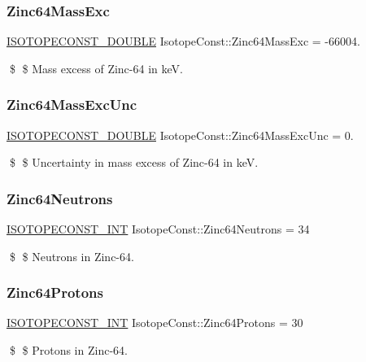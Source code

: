 \subsubsection{\texorpdfstring{Zinc64\+Mass\+Exc}{Zinc64MassExc}}
{\footnotesize\ttfamily \mbox{\hyperlink{group___isotope_const-_macros_ga8f45a7272ce02c0b4c65c44636ed719a}{I\+S\+O\+T\+O\+P\+E\+C\+O\+N\+S\+T\+\_\+\+D\+O\+U\+B\+LE}} Isotope\+Const\+::\+Zinc64\+Mass\+Exc = -\/66004.}

\$ \$ Mass excess of Zinc-\/64 in keV. \mbox{\label{group___isotope_const-_zinc-_zn64_gafa33b07dff4058980ea2e0817e00f0b4}} 
\subsubsection{\texorpdfstring{Zinc64\+Mass\+Exc\+Unc}{Zinc64MassExcUnc}}
{\footnotesize\ttfamily \mbox{\hyperlink{group___isotope_const-_macros_ga8f45a7272ce02c0b4c65c44636ed719a}{I\+S\+O\+T\+O\+P\+E\+C\+O\+N\+S\+T\+\_\+\+D\+O\+U\+B\+LE}} Isotope\+Const\+::\+Zinc64\+Mass\+Exc\+Unc = 0.}

\$ \$ Uncertainty in mass excess of Zinc-\/64 in keV. \mbox{\label{group___isotope_const-_zinc-_zn64_ga15c90230c6179d136aa562e7ba0c5eff}} 
\subsubsection{\texorpdfstring{Zinc64\+Neutrons}{Zinc64Neutrons}}
{\footnotesize\ttfamily \mbox{\hyperlink{group___isotope_const-_macros_ga5f18360b3e99483a35c32d789e62621c}{I\+S\+O\+T\+O\+P\+E\+C\+O\+N\+S\+T\+\_\+\+I\+NT}} Isotope\+Const\+::\+Zinc64\+Neutrons = 34}

\$ \$ Neutrons in Zinc-\/64. \mbox{\label{group___isotope_const-_zinc-_zn64_gaccc8c802f937d0b74a2f300c9fda92dd}} 
\subsubsection{\texorpdfstring{Zinc64\+Protons}{Zinc64Protons}}
{\footnotesize\ttfamily \mbox{\hyperlink{group___isotope_const-_macros_ga5f18360b3e99483a35c32d789e62621c}{I\+S\+O\+T\+O\+P\+E\+C\+O\+N\+S\+T\+\_\+\+I\+NT}} Isotope\+Const\+::\+Zinc64\+Protons = 30}

\$ \$ Protons in Zinc-\/64. 